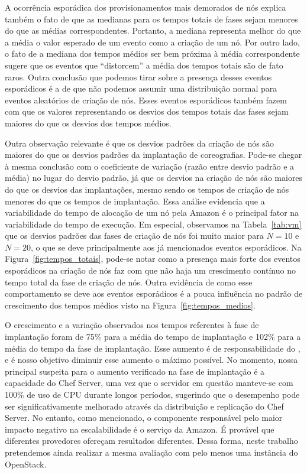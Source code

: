 A ocorrência esporádica dos provisionamentos mais demorados de nós explica também o fato de que as medianas para os tempos totais de fases sejam menores do que as médias correspondentes. Portanto, a mediana representa melhor do que a média o valor esperado de um evento como a criação de um nó. Por outro lado, o fato de a mediana dos tempos médios ser bem próxima à média correspondente sugere que os eventos que ``distorcem'' a média dos tempos totais são de fato raros. Outra conclusão que podemos tirar sobre a presença desses eventos esporádicos é a de que não podemos assumir uma distribuição normal para eventos aleatórios de criação de nós. Esses eventos esporádicos também fazem com que os valores representando os desvios dos tempos totais das fases sejam maiores do que os desvios dos tempos médios. 

Outra observação relevante é que os desvios padrões da criação de nós são maiores do que os desvios padrões da implantação de coreografias. Pode-se chegar à mesma conclusão com o coeficiente de variação (razão entre desvio padrão e a média) no lugar do desvio padrão, já que os desvios na criação de nós são maiores do que os desvios das implantações, mesmo sendo os tempos de criação de nós menores do que os tempos de implantação. Essa análise evidencia que a variabilidade do tempo de alocação de um nó pela Amazon é o principal fator na variabilidade do tempo de execução. Em especial, observamos na Tabela~\ref{tab:vm} que os desvios padrões das fases de criação de nós foi muito maior para $N=10$ e $N=20$, o que se deve principalmente aos já mencionados eventos esporádicos. Na Figura~\ref{fig:tempos_totais}, pode-se notar como a presença mais forte dos eventos esporádicos na criação de nós faz com que não haja um crescimento contínuo no tempo total da fase de criação de nós. Outra evidência de como esse comportamento se deve aos eventos esporádicos é a pouca influência no padrão de crescimento dos tempos médios visto na Figura~\ref{fig:tempos_medios}.

O crescimento e a variação observados nos tempos referentes à fase de implantação foram de 75\% para a média do tempo de implantação e 102\%  para a média do tempo da fase de implantação. Esse aumento é de responsabilidade do \ee, e é nosso objetivo diminuir esse aumento o máximo possível. No momento, nossa principal suspeita para o aumento verificado na fase de implantação é a capacidade do Chef Server, uma vez que o servidor em questão manteve-se com 100\% de uso de CPU durante longos períodos, sugerindo que o desempenho pode ser significativamente melhorado através da distribuição e replicação do Chef Server. No entanto, como mencionado, o componente responsável pelo maior impacto negativo na escalabilidade é o serviço da Amazon. É provável que diferentes provedores ofereçam resultados diferentes. Dessa forma, neste trabalho pretendemos ainda realizar a mesma avaliação com pelo menos uma instância do OpenStack.

